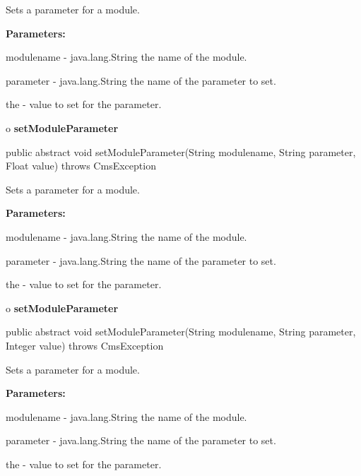 \begin{description}
\htmlDD Sets a parameter for a module. 

\begin{description}
\item {\bf Parameters:}  

modulename - java.lang.String the name of the module.  

parameter - java.lang.String the name of the parameter to set.  

the - value to set for the parameter.  
\end{description}

\end{description}

o {\bf setModuleParameter} 

\begin{PRE}
 public abstract void setModuleParameter(String modulename,
                                         String parameter,
                                         Float value) throws CmsException
\end{PRE}

\begin{description}
\htmlDD Sets a parameter for a module. 

\begin{description}
\item {\bf Parameters:}  

modulename - java.lang.String the name of the module.  

parameter - java.lang.String the name of the parameter to set.  

the - value to set for the parameter.  
\end{description}

\end{description}

o {\bf setModuleParameter} 

\begin{PRE}
 public abstract void setModuleParameter(String modulename,
                                         String parameter,
                                         Integer value) throws CmsException
\end{PRE}

\begin{description}
\htmlDD Sets a parameter for a module. 

\begin{description}
\item {\bf Parameters:}  

modulename - java.lang.String the name of the module.  

parameter - java.lang.String the name of the parameter to set.  

the - value to set for the parameter.  
\end{description}

\end{description}

